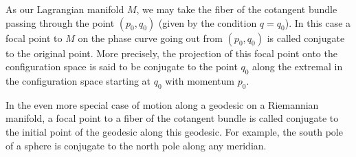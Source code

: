 As our Lagrangian manifold $M$, we may take the fiber of the cotangent bundle passing through the point $(p_0, q_0)$ (given by the condition $q = q_0$). In this case a focal point to $M$ on the phase curve going out from $(p_0, q_0)$ is called conjugate to the original point. More precisely, the projection of this focal point onto the configuration space is said to be conjugate to the point $q_0$ along the extremal in the configuration space starting at $q_0$ with momentum $p_0$.

In the even more special case of motion along a geodesic on a Riemannian manifold, a focal point to a fiber of the cotangent bundle is called conjugate to the initial point of the geodesic along this geodesic. For example, the south pole of a sphere is conjugate to the north pole along any meridian.
